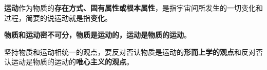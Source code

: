 \textbf{{运动}}作为物质的\textbf{{存在方式、固有属性或根本属性}}，是指宇宙间所发生的一切变化和过程，简要的说运动就是指\textbf{{变化}}。

\textbf{{物质和运动密不可分，物质是运动的，运动是物质的运动}}{。}

{坚持物质和运动相统一的观点，要反对否认物质是运动的}\textbf{{形而上学的观点}}{和反对否认运动是物质的运动的}\textbf{{唯心主义的观点}}{。}
